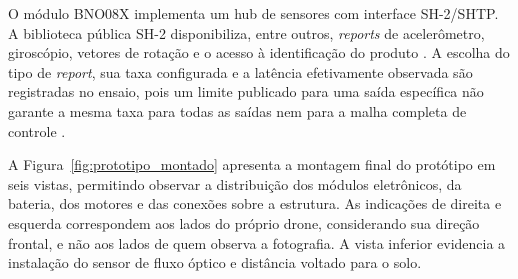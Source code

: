 O módulo BNO08X implementa um hub de sensores com interface SH-2/SHTP. A biblioteca pública SH-2 disponibiliza, entre outros, \textit{reports} de acelerômetro, giroscópio, vetores de rotação e o acesso à identificação do produto \cite{sh2library}. A escolha do tipo de \textit{report}, sua taxa configurada e a latência efetivamente observada são registradas no ensaio, pois um limite publicado para uma saída específica não garante a mesma taxa para todas as saídas nem para a malha completa de controle \cite{bno08xdatasheet}.

A Figura~\ref{fig:prototipo_montado} apresenta a montagem final do protótipo em seis vistas, permitindo observar a distribuição dos módulos eletrônicos, da bateria, dos motores e das conexões sobre a estrutura. As indicações de direita e esquerda correspondem aos lados do próprio drone, considerando sua direção frontal, e não aos lados de quem observa a fotografia. A vista inferior evidencia a instalação do sensor de fluxo óptico e distância voltado para o solo.

